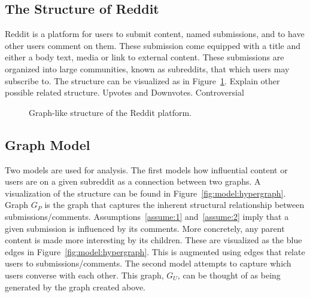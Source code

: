 \documentclass[letterpaper, 10 pt, conference]{ieeeconf}
\theoremstyle{definition}
\newcommand{\red}{\color{red}}
\begin{document}
\subsection{The Structure of Reddit}
Reddit is a platform for users to submit content, named submissions, and to have other users comment on them. These submission come equipped with a title and either a body text, media or link to external content. These submissions are organized into large communities, known as subreddits, that which users may subscribe to. The structure can be visualized as in Figure~\ref{fig:model:reddit}.
{\red Explain other possible related structure. Upvotes and Downvotes. Controversial}

\begin{figure}
  \centering
  \caption{Graph-like structure of the Reddit platform.}
  \label{fig:model:reddit}
\end{figure}

\subsection{Graph Model}
Two models are used for analysis. The first models how influential content or users are on a given subreddit as a connection between two graphs. A visualization of the structure can be found in Figure~\ref{fig:model:hypergraph}. Graph \(G_P\) is the graph that captures the inherent structural relationship between submissions/comments. Assumptions~\ref{assume:1} and~\ref{assume:2} imply that a given submission is influenced by its comments. More concretely, any parent content is made more interesting by its children. These are visualized as the blue edges in Figure~\ref{fig:model:hypergraph}. This is augmented using edges that relate users to submissions/comments. The second model attempts to capture which users converse with each other. This graph, \(G_U\), can be thought of as being generated by the graph created above.
\end{document}
